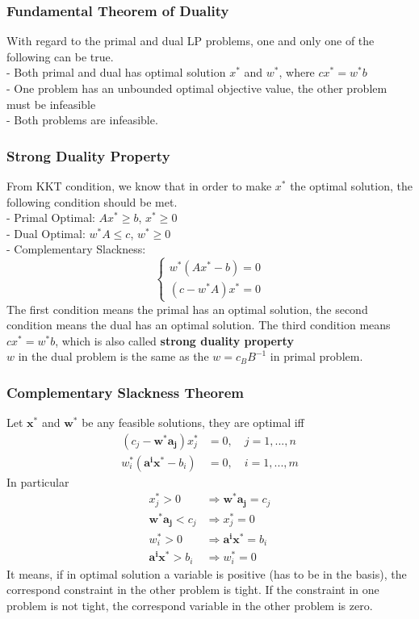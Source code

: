 				\subsubsection{Fundamental Theorem of Duality}
					With regard to the primal and dual LP problems, one and only one of the following can be true. \\
					- Both primal and dual has optimal solution $x^*$ and $w^*$, where $cx^* = w^*b$\\
					- One problem has an unbounded optimal objective value, the other problem must be infeasible\\
					- Both problems are infeasible.

				\subsubsection{Strong Duality Property}
					From KKT condition, we know that in order to make $x^*$ the optimal solution, the following condition should be met.\\
					- Primal Optimal: $Ax^* \ge b$, $x^*\ge 0$\\
					- Dual Optimal: $w^*A \le c$, $w^*\ge 0$\\
					- Complementary Slackness:
					\begin{equation}
						\begin{cases}
							w^*(Ax^*-b) = 0\\
							(c-w^*A)x^* = 0
						\end{cases} 
					\end{equation}
					The first condition means the primal has an optimal solution, the second condition means the dual has an optimal solution. The third condition means $cx^*=w^*b$, which is also called \textbf{strong duality property}\\
					 $w$ in the dual problem is the same as the $w=c_BB^{-1}$ in primal problem.

				\subsubsection{Complementary Slackness Theorem}
					Let $\bm{x^*}$ and $\bm{w^*}$ be any feasible solutions, they are optimal iff
					\begin{align}
						(c_j - \bm{w^*}\bm{a_j})x_j^* &= 0, \quad j = 1,...,n \\
						w_i^*(\bm{a^i}\bm{x^*} - b_i) &= 0, \quad i = 1,...,m
					\end{align}
					In particular
					\begin{align}
						x_j^*>0 &\Rightarrow \bm{w^*}\bm{a_j} = c_j  \\
						\bm{w^*}\bm{a_j} < c_j &\Rightarrow x_j^* = 0  \\
						w_i^* >0 &\Rightarrow \bm{a^i}\bm{x^*} = b_i  \\
						\bm{a^i}\bm{x^*} > b_i &\Rightarrow w_i^*=0
					\end{align}
					It means, if in optimal solution a variable is positive (has to be in the basis), the correspond constraint in the other problem is tight. If the constraint in one problem is not tight, the correspond variable in the other problem is zero.

